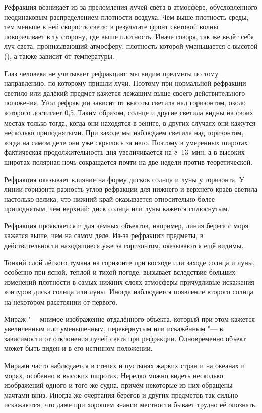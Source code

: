 Рефракция возникает из-за преломления лучей света в атмосфере,
обусловленного неодинаковым распределением плотности воздуха. Чем выше
плотность среды, тем меньше в ней скорость света; в результате фронт
световой волны поворачивает в ту сторону, где выше плотность. Иначе
говоря, так же ведёт себя луч света, пронизывающий атмосферу,
плотность которой уменьшается с высотой (), а также зависит от
температуры.

Глаз человека не учитывает рефракцию: мы видим предметы по тому
направлению, по которому пришли лучи. Поэтому при нормальной рефракции
светило или далёкий предмет кажется лежащим выше своего
действительного положения. Угол рефракции зависит от высоты светила
над горизонтом, около которого достигает 0,5\gr. Таким образом, солнце и
другие светила видны на своих местах только тогда, когда они находятся
в зените, в других случаях они кажутся несколько приподнятыми. При
заходе мы наблюдаем светила над горизонтом, когда на самом деле они
уже скрылось за него. Поэтому в умеренных широтах фактическая
продолжительность дня увеличивается на 8--13~мин, а в высоких широтах
полярная ночь сокращается почти на две недели против теоретической.

Рефракция оказывает влияние на форму дисков солнца и луны у
горизонта. У линии горизонта разность углов рефракции для нижнего и
верхнего краёв светила настолько велика, что нижний край оказывается
относительно более приподнятым, чем верхний: диск солнца или луны
кажется сплюснутым.

Рефракция проявляется и для земных объектов, например, линия берега с
моря кажется выше, чем на самом деле. Из-за рефракции предметы, в
действительности находящиеся уже за горизонтом, оказываются ещё
видимы.

Тонкий слой лёгкого тумана на горизонте при восходе или заходе солнца
и луны, особенно при ясной, тёплой и тихой погоде, вызывает вследствие
больших изменений плотности в самых нижних слоях атмосферы причудливые
искажения контуров диска солнца или луны. Иногда наблюдается появление
второго солнца на некотором расстоянии от первого.

Мираж "--- мнимое изображение отдалённого объекта, который при этом
кажется увеличенным или уменьшенным, перевёрнутым или искажённым "--- в
зависимости от отклонения лучей света при рефракции. Одновременно
объект может быть виден и в его истинном положении.

Миражи часто наблюдается в степях и пустынях жарких стран и на океанах
и морях, особенно в высоких широтах. Нередко можно видеть несколько
изображений одного и того же судна, причём некоторые из них обращены
мачтами вниз. Иногда же очертания берегов и других предметов так
сильно искажаются, что даже при хорошем знании местности бывает трудно
её опознать.

